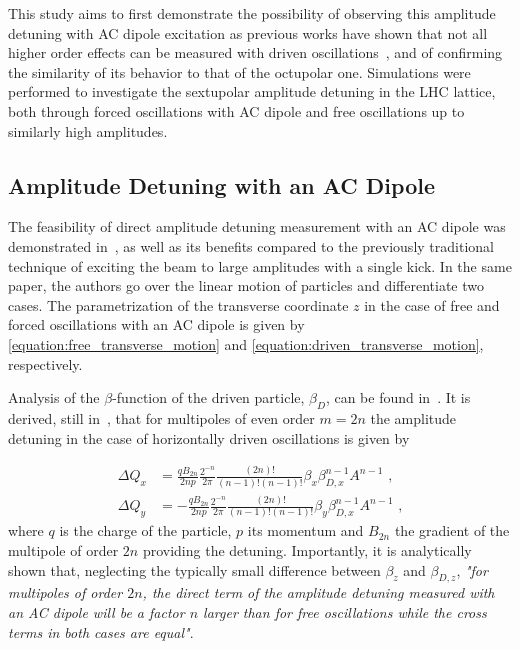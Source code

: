 This study aims to first demonstrate the possibility of observing this amplitude detuning with AC dipole excitation as previous works have shown that not all higher order effects can be measured with driven oscillations~\cite{PRAB:Persson:Suppression_Amplitude_Dependent_Closest_Tune_Approach}, and of confirming the similarity of its behavior to that of the octupolar one.
Simulations were performed to investigate the sextupolar amplitude detuning in the LHC lattice, both through forced oscillations with AC dipole and free oscillations up to similarly high amplitudes.

\subsection*{Amplitude Detuning with an AC Dipole}

The feasibility of direct amplitude detuning measurement with an AC dipole was demonstrated in~\cite{PRAB:White:Direct_Amplitude_Detuning_AC_Dipole}, as well as its benefits compared to the previously traditional technique of exciting the beam to large amplitudes with a single kick.
In the same paper, the authors go over the linear motion of particles and differentiate two cases.
The parametrization of the transverse coordinate \(z\) in the case of free and forced oscillations with an AC dipole is given by \cref{equation:free_transverse_motion} and \cref{equation:driven_transverse_motion}, respectively.

Analysis of the \(\beta\)-function of the driven particle, \(\beta_D\), can be found in~\cite{PHD:Miyamoto,PRAB:Miyamoto:Parametrization_Driven_Betatron_Oscillation,PRAB:White:Direct_Amplitude_Detuning_AC_Dipole}.
It is derived, still in~\cite{PRAB:White:Direct_Amplitude_Detuning_AC_Dipole}, that for multipoles of even order \(m = 2n\) the amplitude detuning in the case of horizontally driven oscillations is given by

\begin{equation}
    \begin{aligned}
        \Delta Q_x &= \frac{q B_{2n}}{2np} \frac{2^{-n}}{2 \pi} \frac{(2n)!}{(n-1)! (n-1)!} \beta_x \beta_{D,x}^{n-1} A^{n-1} \text{ ,} \\
        \Delta Q_y &= -\frac{q B_{2n}}{2np} \frac{2^{-n}}{2 \pi} \frac{(2n)!}{(n-1)! (n-1)!} \beta_y \beta_{D,x}^{n-1} A^{n-1} \text{ ,}
    \end{aligned}
    \label{eqn:transverse_amp_det}
\end{equation}
where \(q\) is the charge of the particle, \(p\) its momentum and \(B_{2n}\) the gradient of the multipole of order \(2n\) providing the detuning.
Importantly, it is analytically shown that, neglecting the typically small difference between \(\beta_z\) and \(\beta_{D,z}\), \textit{"for multipoles of order \(2n\), the direct term of the amplitude detuning measured with an AC dipole will be a factor \(n\) larger than for free oscillations while the cross terms in both cases are equal"}.


